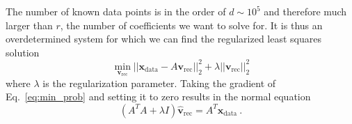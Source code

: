 \documentclass[a4paper]{article}
\begin{document}
The number of known data points is in the order of $d \sim 10^5$ and therefore much larger than $r$, the number of coefficients we want to solve for.
It is thus an overdetermined system for which we can find the regularized least squares solution
\begin{equation} \label{eq:min_prob}
    \min_{\mathbf{v_\mathrm{rec}}}    ||\mathbf{x}_\mathrm{data}- A \mathbf{v}_\mathrm{rec}||_2^2 + \lambda ||\mathbf{v}_\mathrm{rec}||_2^2
\end{equation}
where $\lambda$ is the regularization parameter. Taking the gradient of Eq.~\eqref{eq:min_prob} and setting it to zero results in the normal equation
\begin{equation} \label{eq:normal_eq}
    (A^TA+\lambda I)\hat{\mathbf{v}}_\mathrm{rec} = A^T \mathbf{x}_\mathrm{data}~.
\end{equation}


\end{document}
